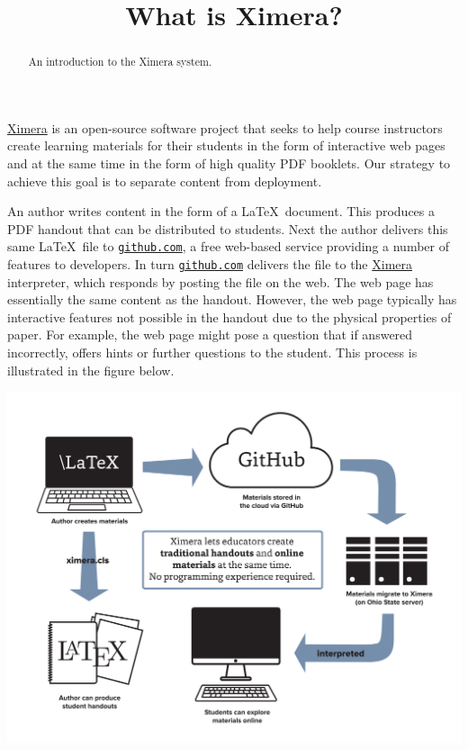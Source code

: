 \documentclass{ximera}
\title{What is Ximera?}
\begin{document}
\begin{abstract}
An introduction to the Ximera system.
\end{abstract}
\maketitle

\href{http://ximera.osu.edu}{\sf Ximera}
is an open-source software project that
seeks to help course instructors create learning materials
for their students in the form of interactive
web pages and at the same time in the form
of high quality PDF booklets.
Our strategy to achieve this goal is to separate
content from deployment.

An author writes content in the form of a \LaTeX\ document.
This produces a PDF handout that can be distributed to students.
Next the author delivers this same \LaTeX\ file to
\href{http://github.com}{\tt github.com},
a free web-based service providing a number of features to developers.
In turn \href{http://github.com}{\tt github.com} delivers
the file to the \href{http://ximera.osu.edu}{\sf Ximera}
interpreter, which responds by posting the file on the web.
The web page has essentially the same content as the handout.
However, the web page typically has interactive features
not possible in the handout due to the physical properties of paper.
For example, the web page might pose a question
that if answered incorrectly, offers hints or further questions
to the student.
This process is illustrated in the figure below.

\begin{image}
\includegraphics[scale=.25]{XimeraGraphic.png}
\end{image}
\end{document}

